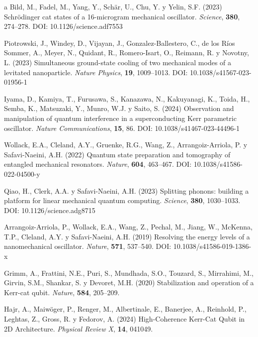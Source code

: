 \documentclass[11pt,a4paper,spanish]{book}
\begin{document}
\begin{thebibliography}{a}
		 Bild, M., Fadel, M., Yang, Y., Schär, U., Chu, Y. y Yelin, S.F. (2023) Schrödinger cat states of a 16-microgram mechanical oscillator. \textit{Science}, \textbf{380}, 274--278. DOI: 10.1126/science.adf7553
		
		 Piotrowski, J., Windey, D., Vijayan, J., Gonzalez-Ballestero, C., de los Ríos Sommer, A., Meyer, N., Quidant, R., Romero-Isart, O., Reimann, R. y Novotny, L. (2023) Simultaneous ground-state cooling of two mechanical modes of a levitated nanoparticle. \textit{Nature Physics}, \textbf{19}, 1009--1013. DOI: 10.1038/s41567-023-01956-1
		
		 Iyama, D., Kamiya, T., Furusawa, S., Kanazawa, N., Kakuyanagi, K., Toida, H., Semba, K., Matsuzaki, Y., Munro, W.J. y Saito, S. (2024) Observation and manipulation of quantum interference in a superconducting Kerr parametric oscillator. \textit{Nature Communications}, \textbf{15}, 86. DOI: 10.1038/s41467-023-44496-1
		
		 Wollack, E.A., Cleland, A.Y., Gruenke, R.G., Wang, Z., Arrangoiz-Arriola, P. y Safavi-Naeini, A.H. (2022) Quantum state preparation and tomography of entangled mechanical resonators. \textit{Nature}, \textbf{604}, 463--467. DOI: 10.1038/s41586-022-04500-y
		
		 Qiao, H., Clerk, A.A. y Safavi-Naeini, A.H. (2023) Splitting phonons: building a platform for linear mechanical quantum computing. \textit{Science}, \textbf{380}, 1030--1033. DOI: 10.1126/science.adg8715
		
		 Arrangoiz-Arriola, P., Wollack, E.A., Wang, Z., Pechal, M., Jiang, W., McKenna, T.P., Cleland, A.Y. y Safavi-Naeini, A.H. (2019) Resolving the energy levels of a nanomechanical oscillator. \textit{Nature}, \textbf{571}, 537--540. DOI: 10.1038/s41586-019-1386-x
		
		 Grimm, A., Frattini, N.E., Puri, S., Mundhada, S.O., Touzard, S., Mirrahimi, M., Girvin, S.M., Shankar, S. y Devoret, M.H. (2020) Stabilization and operation of a Kerr-cat qubit. \textit{Nature}, \textbf{584}, 205--209.
		
		 Hajr, A., Maiwöger, P., Renger, M., Albertinale, E., Banerjee, A., Reinhold, P., Leghtas, Z., Gross, R. y Fedorov, A. (2024) High-Coherence Kerr-Cat Qubit in 2D Architecture. \textit{Physical Review X}, \textbf{14}, 041049.
		

\end{thebibliography}
\end{document}
